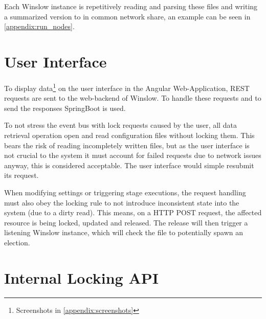 Each Winslow instance is repetitively reading and parsing these files and writing a summarized version to  in common network share, an example can be seen in \autoref{appendix:run_nodes}.

\section{User Interface}
\label{design:springboot}

To display data\footnote{Screenshots in \autoref{appendix:screenshots}} on the user interface in the Angular Web-Application, REST requests are sent to the web-backend of Winslow.
To handle these requests and to send the responses SpringBoot\cite{springboot} is used.

To not stress the event bus with lock requests caused by the user, all data retrieval operation open and read configuration files without locking them.
This bears the risk of reading incompletely written files, but as the user interface is not crucial to the system it must account for failed requests due to network issues anyway, this is considered acceptable.
The user interface would simple resubmit its request. 

When modifying settings or triggering stage executions, the request handling must also obey the locking rule to not introduce inconsistent state into the system (due to a dirty read).
This means, on a HTTP POST request, the affected resource is being locked, updated and released.
The release will then trigger a listening Winslow instance, which will check the file to potentially spawn an election.






\section{Internal Locking API}


